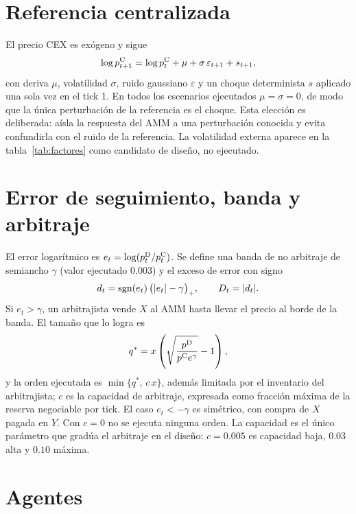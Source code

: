 \section{Referencia centralizada}

El precio CEX es exógeno y sigue
\begin{equation}
  \log p^{\mathrm{C}}_{t+1} = \log p^{\mathrm{C}}_t + \mu + \sigma\,\varepsilon_{t+1} + s_{t+1},
  \label{eq:cex}
\end{equation}
con deriva $\mu$, volatilidad $\sigma$, ruido gaussiano $\varepsilon$ y un choque determinista $s$ aplicado una sola vez en el tick 1. En todos los escenarios ejecutados $\mu=\sigma=0$, de modo que la única perturbación de la referencia es el choque. Esta elección es deliberada: aísla la respuesta del AMM a una perturbación conocida y evita confundirla con el ruido de la referencia. La volatilidad externa aparece en la tabla~\ref{tab:factores} como candidato de diseño, no ejecutado.

\section{Error de seguimiento, banda y arbitraje}

El error logarítmico es $e_t=\log(p^{\mathrm{D}}_t/p^{\mathrm{C}}_t)$. Se define una banda de no arbitraje de semiancho $\gamma$ (valor ejecutado $0.003$) y el exceso de error con signo
\begin{equation}
  d_t = \operatorname{sgn}(e_t)\,\bigl(|e_t|-\gamma\bigr)_+ ,\qquad D_t=|d_t|.
  \label{eq:exceso}
\end{equation}
Si $e_t>\gamma$, un arbitrajista vende $X$ al AMM hasta llevar el precio al borde de la banda. El tamaño que lo logra es
\begin{equation}
  q^{\ast} = x\left(\sqrt{\frac{p^{\mathrm{D}}}{p^{\mathrm{C}} e^{\gamma}}}-1\right),
  \label{eq:qstar}
\end{equation}
y la orden ejecutada es $\min\{q^{\ast},\,c\,x\}$, además limitada por el inventario del arbitrajista; $c$ es la capacidad de arbitraje, expresada como fracción máxima de la reserva negociable por tick. El caso $e_t<-\gamma$ es simétrico, con compra de $X$ pagada en $Y$. Con $c=0$ no se ejecuta ninguna orden. La capacidad es el único parámetro que gradúa el arbitraje en el diseño: $c=0.005$ es capacidad baja, $0.03$ alta y $0.10$ máxima.

\section{Agentes}

